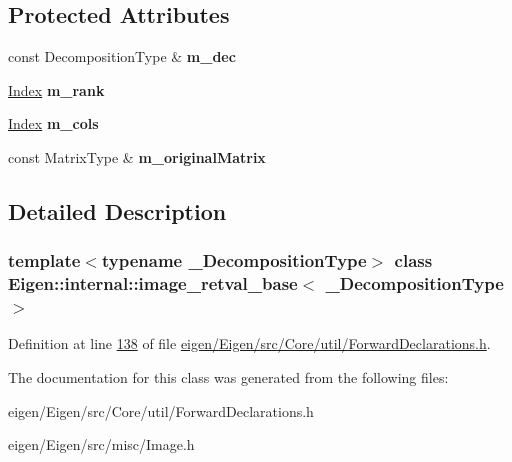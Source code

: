 \subsection*{Protected Attributes}
\begin{DoxyCompactItemize}
\item 
\mbox{\label{struct_eigen_1_1internal_1_1image__retval__base_adf34c04c4dd059e8316e3aa448eaf03a}} 
const Decomposition\+Type \& {\bfseries m\+\_\+dec}
\item 
\mbox{\label{struct_eigen_1_1internal_1_1image__retval__base_a87abdc0d556f40c98626bfd5cdc8fc16}} 
\hyperlink{namespace_eigen_a62e77e0933482dafde8fe197d9a2cfde}{Index} {\bfseries m\+\_\+rank}
\item 
\mbox{\label{struct_eigen_1_1internal_1_1image__retval__base_aeb29203a8686edacf3f9622cd3973e0b}} 
\hyperlink{namespace_eigen_a62e77e0933482dafde8fe197d9a2cfde}{Index} {\bfseries m\+\_\+cols}
\item 
\mbox{\label{struct_eigen_1_1internal_1_1image__retval__base_ad67587052ee3d394241dd9a9a23ddc89}} 
const Matrix\+Type \& {\bfseries m\+\_\+original\+Matrix}
\end{DoxyCompactItemize}


\subsection{Detailed Description}
\subsubsection*{template$<$typename \+\_\+\+Decomposition\+Type$>$\newline
class Eigen\+::internal\+::image\+\_\+retval\+\_\+base$<$ \+\_\+\+Decomposition\+Type $>$}



Definition at line \hyperlink{eigen_2_eigen_2src_2_core_2util_2_forward_declarations_8h_source_l00138}{138} of file \hyperlink{eigen_2_eigen_2src_2_core_2util_2_forward_declarations_8h_source}{eigen/\+Eigen/src/\+Core/util/\+Forward\+Declarations.\+h}.



The documentation for this class was generated from the following files\+:\begin{DoxyCompactItemize}
\item 
eigen/\+Eigen/src/\+Core/util/\+Forward\+Declarations.\+h\item 
eigen/\+Eigen/src/misc/\+Image.\+h\end{DoxyCompactItemize}
